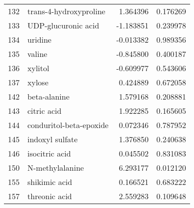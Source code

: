 \begin{tabular}{llrr}
132 &             trans-4-hydroxyproline &  1.364396 &  0.176269 \\
133 &                UDP-glucuronic acid & -1.183851 &  0.239978 \\
134 &                            uridine & -0.013382 &  0.989356 \\
135 &                             valine & -0.845800 &  0.400187 \\
136 &                            xylitol & -0.609977 &  0.543606 \\
137 &                             xylose &  0.424889 &  0.672058 \\
142 &                       beta-alanine &  1.579168 &  0.208881 \\
143 &                        citric acid &  1.922285 &  0.165605 \\
144 &            conduritol-beta-epoxide &  0.072346 &  0.787952 \\
145 &                    indoxyl sulfate &  1.376850 &  0.240638 \\
146 &                     isocitric acid &  0.045502 &  0.831083 \\
150 &                    N-methylalanine &  6.293177 &  0.012120 \\
155 &                      shikimic acid &  0.166521 &  0.683222 \\
157 &                      threonic acid &  2.559283 &  0.109648 \\
\bottomrule
\end{tabular}
